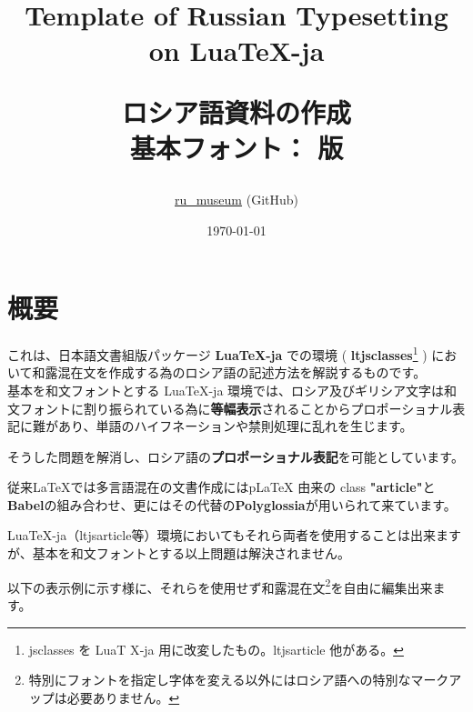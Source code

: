 \documentclass[a4paper,10pt]{ltjsarticle}
\title{
  \huge Template of Russian Typesetting\\ on LuaTeX-ja\vspace{16mm} \par
  \Large{ロシア語資料の作成}\vspace{6mm}\\
  \small{基本フォント： \myMainfont 版}
\par\vspace{120mm}
}
\author{\href{https://github.com/ru-museum/}{ru\_museum} (GitHub)}
\date{\today}
\def\colH#1{\color[HTML]{#1}}
\begin{document}
\maketitle

\thispagestyle{empty}

\clearpage
\addtocounter{page}{-2}

\newpage
  
\tableofcontents
\thispagestyle{empty}

\newpage

\section{概要}
これは、日本語文書組版パッケージ \textbf{\colH{800000} LuaTeX-ja} での環境 ( \textbf{\colH{800000} ltjsclasses}\footnote{jsclasses を LuaT X‐ja 用に改変したもの。ltjsarticle 他がある。} ) において和露混在文を作成する為のロシア語の記述方法を解説するものです。\vspace{6pt}\\
基本を和文フォントとする LuaTeX-ja 環境では、ロシア及びギリシア文字は和文フォントに割り振られている為に\textbf{等幅表示}されることからプロポーショナル表記に難があり、単語のハイフネーションや禁則処理に乱れを生じます。\vspace{6pt}\par

そうした問題を解消し、ロシア語の\textbf{プロポーショナル表記}を可能としています。\vspace{6pt}\par

従来LaTeX{}では多言語混在の文書作成にはp\LaTeX{} 由来の class \textbf{"article"}と\textbf{Babel}の組み合わせ、更にはその代替の\textbf{Polyglossia}が用いられて来ています。\vspace{6pt}\par

LuaTeX-ja（ltjsarticle等）環境においてもそれら両者を使用することは出来ますが、基本を和文フォントとする以上問題は解決されません。\vspace{6pt}\par

以下の表示例に示す様に、それらを使用せず和露混在文\footnote{特別にフォントを指定し字体を変える以外にはロシア語への特別なマークアップは必要ありません。}を自由に編集出来ます。\vspace{6pt}\par
\end{document}
